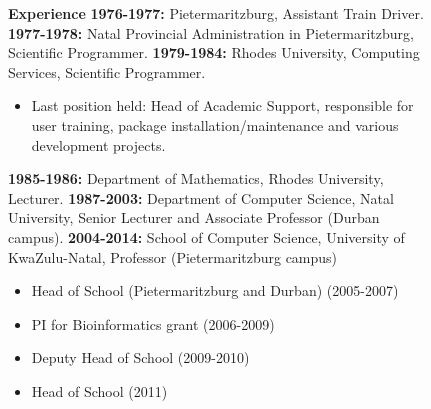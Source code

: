 \begin{description}
\item[] \begin{description}
\item[] {\large \bf Experience}\newline
\newline
{\bf 1976-1977:}
Pietermaritzburg,\newline
Assistant Train Driver. \newline
\newline
{\bf 1977-1978:}
Natal Provincial Administration in Pietermaritzburg, \newline
Scientific Programmer. \newline
 \newline
{\bf 1979-1984:}
Rhodes University, Computing Services, \newline
Scientific Programmer.  
\begin{itemize}
\item Last position held: Head of Academic Support,
           responsible for user training, package installation/maintenance
           and various development projects.
\end{itemize}

{\bf 1985-1986:}
Department of Mathematics, Rhodes University, \newline
Lecturer. \newline
\newline
{\bf 1987-2003:}
Department of Computer Science, Natal University, \newline
Senior Lecturer and Associate Professor (Durban campus). \newline
\newline
{\bf 2004-2014:}
School of Computer Science, University of KwaZulu-Natal,  \newline
Professor (Pietermaritzburg campus)
\begin{itemize}
\item  Head of School (Pietermaritzburg and Durban) (2005-2007)
\item  PI for Bioinformatics grant (2006-2009)
\item  Deputy Head  of School (2009-2010)
\item  Head  of School (2011)
\end{itemize}



\end{description}
\end{description}
